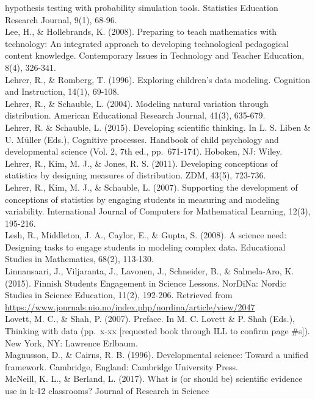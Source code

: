 \documentclass[]{book}
\theoremstyle{definition}
\theoremstyle{definition}
\theoremstyle{definition}
\theoremstyle{remark}
\begin{document}
hypothesis testing with probability simulation tools. Statistics
Education Research Journal, 9(1), 68-96.\\
Lee, H., \& Hollebrands, K. (2008). Preparing to teach mathematics with
technology: An integrated approach to developing technological
pedagogical content knowledge. Contemporary Issues in Technology and
Teacher Education, 8(4), 326-341.\\
Lehrer, R., \& Romberg, T. (1996). Exploring children's data modeling.
Cognition and Instruction, 14(1), 69-108.\\
Lehrer, R., \& Schauble, L. (2004). Modeling natural variation through
distribution. American Educational Research Journal, 41(3), 635-679.\\
Lehrer, R. \& Schauble, L. (2015). Developing scientific thinking. In L.
S. Liben \& U. Müller (Eds.), Cognitive processes. Handbook of child
psychology and developmental science (Vol. 2, 7th ed., pp.~671-174).
Hoboken, NJ: Wiley.\\
Lehrer, R., Kim, M. J., \& Jones, R. S. (2011). Developing conceptions
of statistics by designing measures of distribution. ZDM, 43(5),
723-736.\\
Lehrer, R., Kim, M. J., \& Schauble, L. (2007). Supporting the
development of conceptions of statistics by engaging students in
measuring and modeling variability. International Journal of Computers
for Mathematical Learning, 12(3), 195-216.\\
Lesh, R., Middleton, J. A., Caylor, E., \& Gupta, S. (2008). A science
need: Designing tasks to engage students in modeling complex data.
Educational Studies in Mathematics, 68(2), 113-130.\\
Linnansaari, J., Viljaranta, J., Lavonen, J., Schneider, B., \&
Salmela-Aro, K. (2015). Finnish Students Engagement in Science Lessons.
NorDiNa: Nordic Studies in Science Education, 11(2), 192-206. Retrieved
from
\url{https://www.journals.uio.no/index.php/nordina/article/view/2047}\\
Lovett, M. C., \& Shah, P. (2007). Preface. In M. C. Lovett \& P. Shah
(Eds.), Thinking with data (pp.~x-xx {[}requested book through ILL to
confirm page \#s{]}). New York, NY: Lawrence Erlbaum.\\
Magnusson, D., \& Cairns, R. B. (1996). Developmental science: Toward a
unified framework. Cambridge, England: Cambridge University Press.\\
McNeill, K. L., \& Berland, L. (2017). What is (or should be) scientific
evidence use in k‐12 classrooms? Journal of Research in Science
\end{document}
